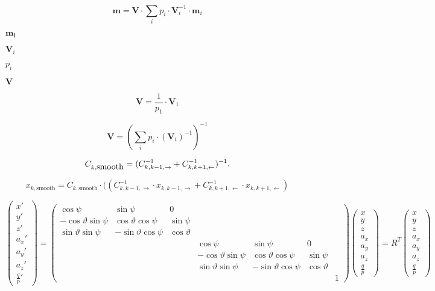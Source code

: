 \documentclass{article}
\begin{document}
\[ \mathbf{m} = \mathbf{V} \cdot \sum_{i}p_{i}\cdot \mathbf{V}_{i}^{-1}\cdot \mathbf{m}_{i} \]
\pagebreak

$\mathbf{m_{i}}$
\pagebreak

$\mathbf{V}_{i}$
\pagebreak

$p_{i}$
\pagebreak

$\mathbf{V}$
\pagebreak

\[ \mathbf{V} = \frac{1}{p_{1}}\cdot\mathbf{V}_{1} \]
\pagebreak

\[ \mathbf{V} = \left( \sum_{i} p_{i} \cdot \left( \mathbf{V}_{i}\right)^{-1} \right)^{-1} \]
\pagebreak

\[ C_{k,\mbox{smooth}} = (C_{k,k-1,\rightarrow}^{-1}+C_{k,k+1,\leftarrow}^{-1})^{-1}. \\ \]
\pagebreak

\[ x_{k,\mbox{smooth}} = C_{k,\mbox{smooth}} \cdot ((C_{k,k-1,\rightarrow}^{-1}\cdot x_{k,k-1,\rightarrow} + C_{k,k+1,\leftarrow}^{-1}\cdot x_{k,k+1,\leftarrow}) \]
\pagebreak

\[ \left(\begin{array}{c} x'\\ y'\\ z'\\ a_{x}'\\ a_{y}'\\ a_{z}'\\ \frac{q}{p}'\end{array}\right)=\left(\begin{array}{ccccccc} \cos\psi & \sin\psi & 0\\ -\cos\vartheta\sin\psi & \cos\vartheta\cos\psi & \sin\psi\\ \sin\vartheta\sin\psi & -\sin\vartheta\cos\psi & \cos\vartheta\\ & & & \cos\psi & \sin\psi & 0\\ & & & -\cos\vartheta\sin\psi & \cos\vartheta\cos\psi & \sin\psi\\ & & & \sin\vartheta\sin\psi & -\sin\vartheta\cos\psi & \cos\vartheta\\ & & & & & & 1\end{array}\right)\left(\begin{array}{c} x\\ y\\ z\\ a_{x}\\ a_{y}\\ a_{z}\\ \frac{q}{p}\end{array}\right)=R^{T}\left(\begin{array}{c} x\\ y\\ z\\ a_{x}\\ a_{y}\\ a_{z}\\ \frac{q}{p}\end{array}\right)\]
\pagebreak
\end{document}
